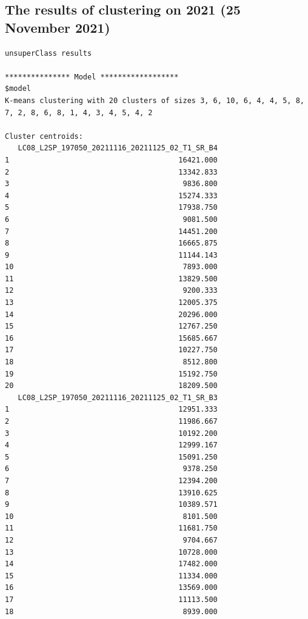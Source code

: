 \documentclass[remotesensing,article,submit,pdftex,moreauthors]{Definitions/mdpi}
\begin{document}
\subsection[\appendixname~\thesubsection]{The results of clustering on 2021 (25 November 2021)}
\begin{scriptsize}
\begin{verbatim}
unsuperClass results

*************** Model ******************
$model
K-means clustering with 20 clusters of sizes 3, 6, 10, 6, 4, 4, 5, 8, 7, 2, 8, 6, 8, 1, 4, 3, 4, 5, 4, 2

Cluster centroids:
   LC08_L2SP_197050_20211116_20211125_02_T1_SR_B4
1                                       16421.000
2                                       13342.833
3                                        9836.800
4                                       15274.333
5                                       17938.750
6                                        9081.500
7                                       14451.200
8                                       16665.875
9                                       11144.143
10                                       7893.000
11                                      13829.500
12                                       9200.333
13                                      12005.375
14                                      20296.000
15                                      12767.250
16                                      15685.667
17                                      10227.750
18                                       8512.800
19                                      15192.750
20                                      18209.500
   LC08_L2SP_197050_20211116_20211125_02_T1_SR_B3
1                                       12951.333
2                                       11986.667
3                                       10192.200
4                                       12999.167
5                                       15091.250
6                                        9378.250
7                                       12394.200
8                                       13910.625
9                                       10389.571
10                                       8101.500
11                                      11681.750
12                                       9704.667
13                                      10728.000
14                                      17482.000
15                                      11334.000
16                                      13569.000
17                                      11113.500
18                                       8939.000

\end{verbatim}
\end{scriptsize}
\end{document}
